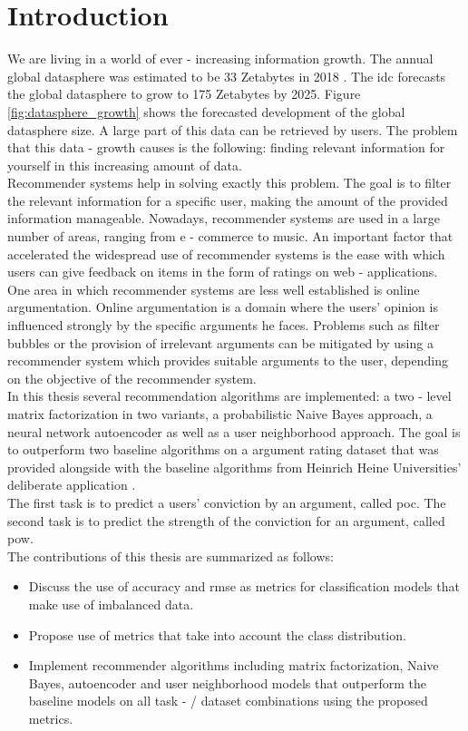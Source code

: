 \listoffigures
\listoftables
{}
\printglossary[type=\acronymtype, nonumberlist]

\section{Introduction}
We are living in a world of ever - increasing information growth. The annual global datasphere was estimated to be 33 Zetabytes in 2018 \cite{rydning2018digitization}. The \acrfull{idc} forecasts the global datasphere to grow to 175 Zetabytes by 2025. Figure \ref{fig:datasphere_growth} shows the forecasted development of the global datasphere size. A large part of this data can be retrieved by users. The problem that this data - growth causes is the following: finding relevant information for yourself in this increasing amount of data.\\Recommender systems help in solving exactly this problem. The goal is to filter the relevant information for a specific user, making the amount of the provided information manageable.
Nowadays, recommender systems are used in a large number of areas, ranging from e - commerce to music.
An important factor that accelerated the widespread use of recommender systems is the ease with which users can give feedback on items in the form of ratings on web - applications.\\
One area in which recommender systems are less well established is online argumentation. Online argumentation is a domain where the users' opinion is influenced strongly by the specific arguments he faces. Problems such as filter bubbles or the provision of irrelevant arguments can be mitigated by using a recommender system
which provides suitable arguments to the user, depending on the objective of the recommender system.\\
In this thesis several recommendation algorithms are implemented: a two - level matrix factorization in two variants, a probabilistic Naive Bayes approach, a neural network autoencoder as well as a user neighborhood approach. The goal is to outperform two baseline algorithms on a argument rating dataset that was provided alongside with the baseline algorithms from Heinrich Heine Universities' deliberate application \cite{prakken2020deliberate}.\\
The first task is to predict a users' conviction by an argument, called \acrfull{poc}. The second task is to predict the strength of the conviction for an argument, called \acrfull{pow}.\\
The contributions of this thesis are summarized as follows:
\begin{itemize}
    \item Discuss the use of accuracy and \acrshort{rmse} as metrics for classification models that make use of imbalanced data.
    \item Propose use of metrics that take into account the class distribution.
    \item Implement recommender algorithms including matrix factorization, Naive Bayes, autoencoder and user neighborhood models that outperform the baseline models on all task - / dataset combinations using the proposed metrics.
 \end{itemize}

